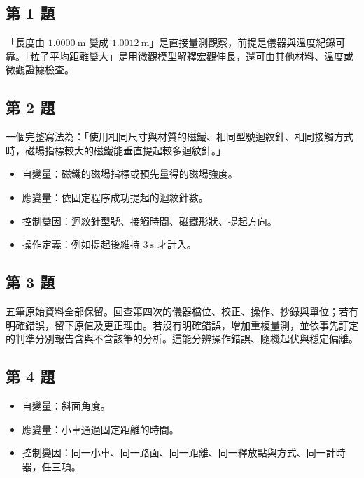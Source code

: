 \documentclass[11pt,a4paper]{article}
\providecommand{\tightlist}{%
  \setlength{\itemsep}{0pt}\setlength{\parskip}{0pt}}
\begin{document}
\subsection{第 1 題}\label{ux7b2c-1-ux984c}

「長度由 \(1.0000\ \mathrm m\) 變成 \(1.0012\ \mathrm m\)」是直接量測觀察，前提是儀器與溫度紀錄可靠。「粒子平均距離變大」是用微觀模型解釋宏觀伸長，還可由其他材料、溫度或微觀證據檢查。

\subsection{第 2 題}\label{ux7b2c-2-ux984c}

一個完整寫法為：「使用相同尺寸與材質的磁鐵、相同型號迴紋針、相同接觸方式時，磁場指標較大的磁鐵能垂直提起較多迴紋針。」

\begin{itemize}
\tightlist
\item
  自變量：磁鐵的磁場指標或預先量得的磁場強度。
\item
  應變量：依固定程序成功提起的迴紋針數。
\item
  控制變因：迴紋針型號、接觸時間、磁鐵形狀、提起方向。
\item
  操作定義：例如提起後維持 \(3\ \mathrm s\) 才計入。
\end{itemize}

\subsection{第 3 題}\label{ux7b2c-3-ux984c}

五筆原始資料全部保留。回查第四次的儀器檔位、校正、操作、抄錄與單位；若有明確錯誤，留下原值及更正理由。若沒有明確錯誤，增加重複量測，並依事先訂定的判準分別報告含與不含該筆的分析。這能分辨操作錯誤、隨機起伏與穩定偏離。

\subsection{第 4 題}\label{ux7b2c-4-ux984c}

\begin{itemize}
\tightlist
\item
  自變量：斜面角度。
\item
  應變量：小車通過固定距離的時間。
\item
  控制變因：同一小車、同一路面、同一距離、同一釋放點與方式、同一計時器，任三項。
\end{itemize}
\end{document}
